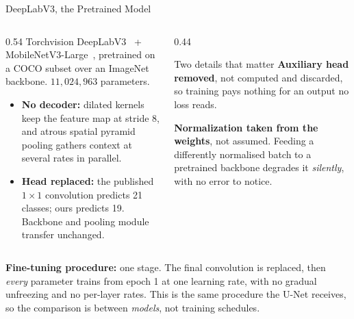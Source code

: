 \begin{frame}{DeepLabV3, the Pretrained Model}
\small
\begin{columns}[T]
\begin{column}{0.54\textwidth}
Torchvision DeepLabV3~\cite{chen2017deeplabv3} + MobileNetV3-Large~\cite{howard2019mobilenetv3},
pretrained on a COCO subset over an ImageNet backbone. $11{,}024{,}963$ parameters.
\begin{itemize}
    \item \textbf{No decoder:} dilated kernels keep the feature map at stride 8, and atrous
          spatial pyramid pooling gathers context at several rates in parallel.
    \item \textbf{Head replaced:} the published $1\times1$ convolution predicts 21 classes; ours
          predicts 19. Backbone and pooling module transfer unchanged.
\end{itemize}
\end{column}
\begin{column}{0.44\textwidth}
\begin{block}{Two details that matter}
\footnotesize
\textbf{Auxiliary head removed}, not computed and discarded, so training pays nothing for an output
no loss reads.

\textbf{Normalization taken from the weights}, not assumed. Feeding a differently normalised batch
to a pretrained backbone degrades it \emph{silently}, with no error to notice.
\end{block}
\end{column}
\end{columns}

\vspace{0.1cm}
\footnotesize
\textbf{Fine-tuning procedure:} one stage. The final convolution is replaced, then \emph{every}
parameter trains from epoch 1 at one learning rate, with no gradual unfreezing and no per-layer rates.
This is the same procedure the U-Net receives, so the comparison is between \emph{models}, not training schedules.
\end{frame}

